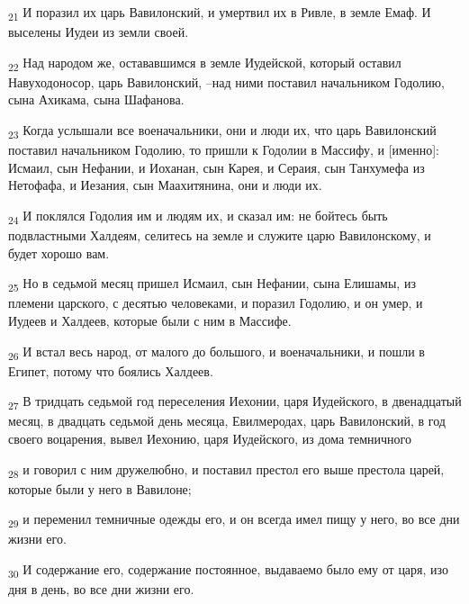 \begin{tcolorbox}
\textsubscript{21} И поразил их царь Вавилонский, и умертвил их в Ривле, в земле Емаф. И выселены Иудеи из земли своей.
\end{tcolorbox}
\begin{tcolorbox}
\textsubscript{22} Над народом же, остававшимся в земле Иудейской, который оставил Навуходоносор, царь Вавилонский, --над ними поставил начальником Годолию, сына Ахикама, сына Шафанова.
\end{tcolorbox}
\begin{tcolorbox}
\textsubscript{23} Когда услышали все военачальники, они и люди их, что царь Вавилонский поставил начальником Годолию, то пришли к Годолии в Массифу, и [именно]: Исмаил, сын Нефании, и Иоханан, сын Карея, и Сераия, сын Танхумефа из Нетофафа, и Иезания, сын Маахитянина, они и люди их.
\end{tcolorbox}
\begin{tcolorbox}
\textsubscript{24} И поклялся Годолия им и людям их, и сказал им: не бойтесь быть подвластными Халдеям, селитесь на земле и служите царю Вавилонскому, и будет хорошо вам.
\end{tcolorbox}
\begin{tcolorbox}
\textsubscript{25} Но в седьмой месяц пришел Исмаил, сын Нефании, сына Елишамы, из племени царского, с десятью человеками, и поразил Годолию, и он умер, и Иудеев и Халдеев, которые были с ним в Массифе.
\end{tcolorbox}
\begin{tcolorbox}
\textsubscript{26} И встал весь народ, от малого до большого, и военачальники, и пошли в Египет, потому что боялись Халдеев.
\end{tcolorbox}
\begin{tcolorbox}
\textsubscript{27} В тридцать седьмой год переселения Иехонии, царя Иудейского, в двенадцатый месяц, в двадцать седьмой день месяца, Евилмеродах, царь Вавилонский, в год своего воцарения, вывел Иехонию, царя Иудейского, из дома темничного
\end{tcolorbox}
\begin{tcolorbox}
\textsubscript{28} и говорил с ним дружелюбно, и поставил престол его выше престола царей, которые были у него в Вавилоне;
\end{tcolorbox}
\begin{tcolorbox}
\textsubscript{29} и переменил темничные одежды его, и он всегда имел пищу у него, во все дни жизни его.
\end{tcolorbox}
\begin{tcolorbox}
\textsubscript{30} И содержание его, содержание постоянное, выдаваемо было ему от царя, изо дня в день, во все дни жизни его.
\end{tcolorbox}

